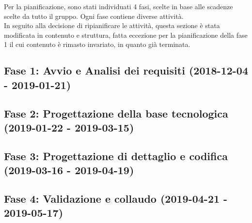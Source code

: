 Per la pianificazione, sono stati individuati 4 fasi, scelte in base alle scadenze scelte da tutto il gruppo. Ogni fase contiene diverse attività.\\

\noindent In seguito alla decisione di ripianificare le attività, questa sezione è stata modificata in contenuto e struttura, fatta eccezione per la pianificazione della fase 1 il cui contenuto è rimasto invariato, in quanto già terminata.
\subsection{Fase 1: Avvio e Analisi dei requisiti (2018-12-04 - 2019-01-21)}
	

\subsection{Fase 2: Progettazione della base tecnologica (2019-01-22 - 2019-03-15)}	
	
	
\subsection{Fase 3: Progettazione di dettaglio e codifica (2019-03-16 - 2019-04-19)}
	
	
\subsection{Fase 4: Validazione e collaudo (2019-04-21 - 2019-05-17)}
	
	
\newpage